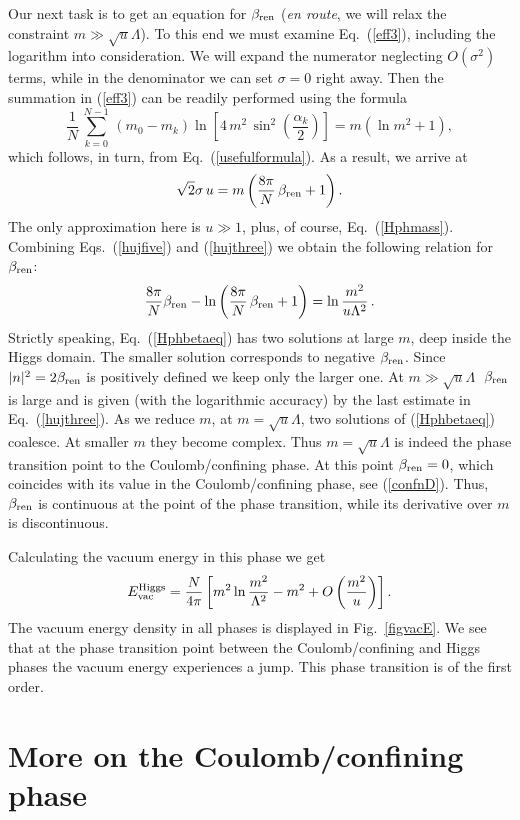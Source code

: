 \documentclass[epsfig,12pt]{article}
\def\beq{\begin{equation}}
\def\eeq{\end{equation}}
\def\beq{\begin{equation}}
\def\eeq{\end{equation}}
\begin{document}
{Our next task is to get an equation for $\beta_{\rm ren}$ ({\em en route}, we will relax 
the constraint $m\gg\sqrt{u}\Lambda$). To this end we must examine Eq.~(\ref{eff3}),
including the logarithm into consideration. We will expand the numerator neglecting $O(\sigma^2)$ terms,
while in the denominator we can set $\sigma =0$ right away. Then the summation in 
(\ref{eff3}) can be readily performed
using the formula
\beq
\frac{1}{N}\,\sum_{k=0}^{N-1}\, \left(m_0-m_k\right)\ln\left[4\,m^2\,\sin^2\left(\frac{\alpha_k}{2}\right)\right]
=m\left(\ln m^2+1\right),
\label{hujfour}
\eeq
which follows, in turn, from Eq.~(\ref{usefulformula}). As a result, we arrive at
\beq
\sqrt{2}\sigma\,u = m\left(\frac{8\pi}{N}\,\beta_{\rm ren} +1\right).
\label{hujfive}
\eeq
The only approximation here is $u\gg 1$, plus, of course, Eq.~(\ref{Hphmass}). Combining Eqs.~(\ref{hujfive})
and (\ref{hujthree}) we obtain the following relation for $\beta_{\rm ren}$:
\beq
\frac{8\pi}{N}\beta_{\rm ren}- \ln{\left(\frac{8\pi}{N}\,\beta_{\rm ren}+1 \right)}=\ln{\frac{m^2}{u\Lambda^2}}  \,.
\label{Hphbetaeq}
\eeq
Strictly speaking, Eq.~(\ref{Hphbetaeq}) has two solutions at large $m$, deep inside the Higgs domain. 
The smaller solution corresponds to  negative $\beta_{\rm ren}$. Since $|n|^2=2\beta_{\rm ren}$ is positively defined we keep only
 the larger one. At $m \gg\sqrt{u}\Lambda\;$ $\beta_{\rm ren}$ is large and is given 
(with the logarithmic accuracy) by the last estimate
in Eq.~(\ref{hujthree}).
As we reduce $m$, at $m = \sqrt{u}\Lambda$, two solutions of (\ref{Hphbetaeq}) coalesce. 
At smaller $m$ they become complex. Thus
$m = \sqrt{u}\Lambda$ is indeed the phase transition point to the Coulomb/confining phase.
At this point $\beta_{\rm ren}=0$, which coincides with its value in the Coulomb/confining phase, see
(\ref{confnD}). Thus, $\beta_{\rm ren}$ is continuous at the point of the phase transition, while its
derivative over $m$ is discontinuous.

Calculating the vacuum energy in this phase we get
\beq
E_{\rm vac}^{\rm Higgs}= \frac{N}{4\pi}\left[ m^2\ln {\frac{m^2}{\Lambda^2}}-m^2 +O\left(\frac{m^2}{u}
\right)\right].
\label{HiggsEvac}
\eeq
The vacuum energy density in all phases is displayed in Fig.~\ref{figvacE}. We see that
at the phase transition point between the Coulomb/confining and Higgs phases the vacuum energy experiences a jump.
This phase transition is of the first order.


\section{More on the Coulomb/confining phase}
\label{moccp}
\setcounter{equation}{0}

}
\end{document}
